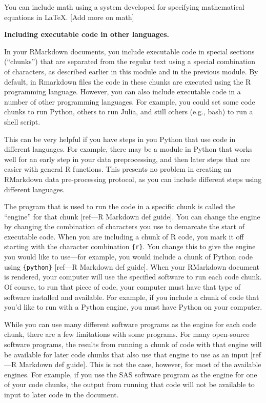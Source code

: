 \documentclass[]{tufte-book}
\begin{document}
You can include math using a system developed for specifying mathematical
equations in LaTeX. {[}Add more on math{]}

\textbf{Including executable code in other languages.}

In your RMarkdown documents, you include executable code in special sections
(``chunks'') that are separated from the regular text using a special combination
of characters, as described earlier in this module and in the previous module.
By default, in Rmarkdown files the code in these chunks are executed using the R
programming language. However, you can also include executable code in a number
of other programming languages. For example, you could set some code chunks to
run Python, others to run Julia, and still others (e.g., bash) to run a shell script.

This can be very helpful if you have steps in you Python that use code in
different languages. For example, there may be a module in Python that
works well for an early step in your data preprocessing, and then later
steps that are easier with general R functions. This presents no problem in
creating an RMarkdown data pre-processing protocol, as you can include
different steps using different languages.

The program that is used to run the code in a specific chunk is called the
``engine'' for that chunk {[}ref---R Markdown def guide{]}. You can change the engine
by changing the combination of characters you use to demarcate the start of
executable code. When you are including a chunk of R code, you mark it off
starting with the character combination \texttt{\textasciigrave{}\textasciigrave{}\textasciigrave{}\{r\}}. You change this to
give the engine you would like to use---for example, you would include a chunk
of Python code using \texttt{\textasciigrave{}\textasciigrave{}\textasciigrave{}\{python\}} {[}ref---R Markdown def guide{]}. When
your RMarkdown document is rendered, your computer will use the specified
software to run each code chunk. Of course, to run that piece of code, your
computer must have that type of software installed and available. For example,
if you include a chunk of code that you'd like to run with a Python engine, you
must have Python on your computer.

While you can use many different software programs as the engine for each code
chunk, there are a few limitations with some programs. For many open-source
software programs, the results from running a chunk of code with that engine
will be available for later code chunks that also use that engine to use as an
input {[}ref---R Markdown def guide{]}. This is not the case, however, for most of
the available engines. For example, if you use the SAS software program as the
engine for one of your code chunks, the output from running that code will not
be available to input to later code in the document.
\end{document}
